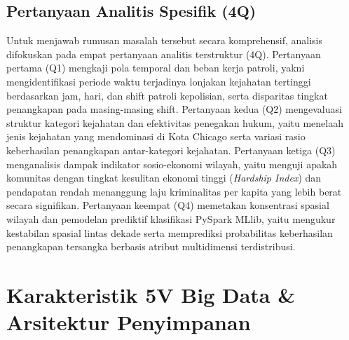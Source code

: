 \documentclass[11pt,a4paper]{article}
\begin{document}
\subsection{Pertanyaan Analitis Spesifik (4Q)}
Untuk menjawab rumusan masalah tersebut secara komprehensif, analisis difokuskan pada empat pertanyaan analitis terstruktur (4Q). Pertanyaan pertama (Q1) mengkaji pola temporal dan beban kerja patroli, yakni mengidentifikasi periode waktu terjadinya lonjakan kejahatan tertinggi berdasarkan jam, hari, dan shift patroli kepolisian, serta disparitas tingkat penangkapan pada masing-masing shift. Pertanyaan kedua (Q2) mengevaluasi struktur kategori kejahatan dan efektivitas penegakan hukum, yaitu menelaah jenis kejahatan yang mendominasi di Kota Chicago serta variasi rasio keberhasilan penangkapan antar-kategori kejahatan. Pertanyaan ketiga (Q3) menganalisis dampak indikator sosio-ekonomi wilayah, yaitu menguji apakah komunitas dengan tingkat kesulitan ekonomi tinggi (\textit{Hardship Index}) dan pendapatan rendah menanggung laju kriminalitas per kapita yang lebih berat secara signifikan. Pertanyaan keempat (Q4) memetakan konsentrasi spasial wilayah dan pemodelan prediktif klasifikasi PySpark MLlib, yaitu mengukur kestabilan spasial lintas dekade serta memprediksi probabilitas keberhasilan penangkapan tersangka berbasis atribut multidimensi terdistribusi.

\section{Karakteristik 5V Big Data \& Arsitektur Penyimpanan}
\end{document}
